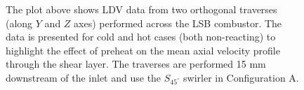 \begin{figure}

\centering



\caption[Effect of preheat temperature on the LSB flow field - II]{The plot above shows LDV data from two orthogonal traverses (along \(Y\) and \(Z\) axes) performed across the LSB combustor. The data is presented for cold and hot cases (both non-reacting) to highlight the effect of preheat on the mean axial velocity profile through the shear layer. The traverses are performed 15 mm downstream of the inlet and use the \(S_{45^\circ}\) swirler in Configuration A.}

\label{fig:temperatureLDVTransverse}

\end{figure}

